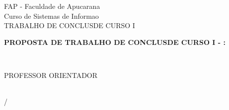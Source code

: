 
\begin{titlepage}
\label{pro:capa}
  \begin{center}
    FAP - Faculdade de Apucarana\\
    Curso de Sistemas de Informa\ca o\\
    TRABALHO DE CONCLUS\AO DE CURSO I\\
    \vfill
    
    \textbf{PROPOSTA DE TRABALHO DE CONCLUS\AO DE CURSO I - \NOME: \ASSUNTO}\\
    \vfill

    \AUTOR\\
    \vfill

    PROFESSOR ORIENTADOR\\
    \ORIENTADOR\\
    \vfill

    \begin{espacosimples}
      {\LOCAL}/{\DATA}
    \end{espacosimples}
  \end{center}
\end{titlepage}
